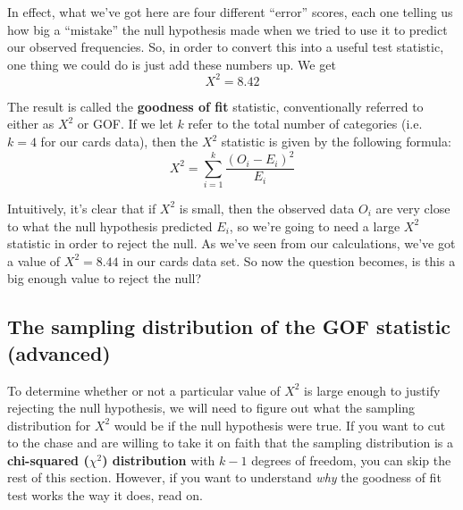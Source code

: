 \documentclass[
]{book}
\theoremstyle{definition}
\theoremstyle{definition}
\theoremstyle{definition}
\theoremstyle{definition}
\theoremstyle{remark}
\begin{document}
In effect, what we've got here are four different ``error'' scores, each one telling us how big a ``mistake'' the null hypothesis made when we tried to use it to predict our observed frequencies. So, in order to convert this into a useful test statistic, one thing we could do is just add these numbers up. We get
\[
X^2 = 8.42
\]

The result is called the \textbf{goodness of fit} statistic, conventionally referred to either as \(X^2\) or GOF. If we let \(k\) refer to the total number of categories (i.e.~\(k=4\) for our cards data), then the \(X^2\) statistic is given by the following formula:
\[
X^2 = \sum_{i=1}^k \frac{(O_i - E_i)^2}{E_i}
\]

Intuitively, it's clear that if \(X^2\) is small, then the observed data \(O_i\) are very close to what the null hypothesis predicted \(E_i\), so we're going to need a large \(X^2\) statistic in order to reject the null. As we've seen from our calculations, we've got a value of \(X^2 = 8.44\) in our cards data set. So now the question becomes, is this a big enough value to reject the null?

\hypertarget{the-sampling-distribution-of-the-gof-statistic-advanced}{%
\subsection{The sampling distribution of the GOF statistic (advanced)}\label{the-sampling-distribution-of-the-gof-statistic-advanced}}

To determine whether or not a particular value of \(X^2\) is large enough to justify rejecting the null hypothesis, we will need to figure out what the sampling distribution for \(X^2\) would be if the null hypothesis were true. If you want to cut to the chase and are willing to take it on faith that the sampling distribution is a \textbf{chi-squared (\(\chi^2\)) distribution} with \(k-1\) degrees of freedom, you can skip the rest of this section. However, if you want to understand \emph{why} the goodness of fit test works the way it does, read on.
\end{document}
